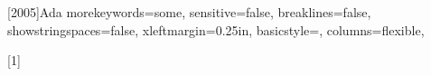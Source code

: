 
\newcommand{\newterm}[1]{\emph{#1}}    %
\newcommand{\code}[1]{\texttt{#1}}     %
\newcommand{\filename}[1]{\texttt{#1}} %
\newcommand{\SPARK}{\textsc{Spark}}    %


%
\let\underscore\_
\newcommand{\breakingunderscore}{\renewcommand{\_}{\underscore\hspace{0pt}}}

\breakingunderscore



\long{}

\long{}

\long{}

\long{}



[2005]{Ada}
{
  morekeywords={some},
  sensitive=false,
  breaklines=false,
  showstringspaces=false,
  xleftmargin=0.25in,
  basicstyle=\small\sffamily,
  columns=flexible,
}
\lstset{language=Ada2012, showlines=true}

%
[1]
   {\lstset{language=Ada2012,xleftmargin=#1}}
   {}

%
\newcommand{\wideinputlisting}[2]{%
   }


